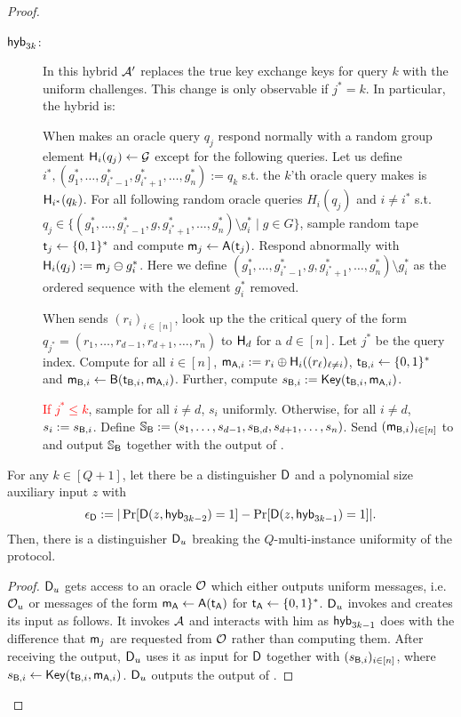 \begin{proof}
\begin{description}
 \item[$\mathsf{hyb}_{3k}$:]  In this hybrid $\mathcal{A}'$ replaces the true key exchange keys for query $k$ with the uniform challenges. This change is only observable if $j^*=k$. In  particular, the hybrid is:
 
 
 When \Adv makes an oracle query $q_{j}$ respond normally with a random group element $\mathsf{H}_i(q_{j})\leftarrow\mathcal{G}$ except for the following queries. Let us define $i^*, (g^*_1,\dots, g^*_{i^*-1},g^*_{i^*+1},\dots, g^*_{n}):=q_k$ s.t. the $k$'th oracle query \Adv makes is $\mathsf{H}_{i^*}(q_{k})$. 
For all following random oracle queries $H_i(q_j)$ and $i\neq i^*$ s.t. $q_j\in \{ (g^*_1,\dots, g^*_{i^*-1}, g,g^*_{i^*+1},\dots, g^*_{n}) \setminus g^*_i \mid g\in G \}$, sample random tape $\mathsf{t}_j\leftarrow\{0,1\}^*$ and compute $\mathsf{m}_{j}\leftarrow\mathsf{A}(\mathsf{t}_j)$. 
Respond abnormally with $\mathsf{H}_i(q_j):=\mathsf{m}_j\ominus g^*_{i}$. Here we define $(g^*_1,\dots, g^*_{i^*-1}, g,g^*_{i^*+1},\dots, g^*_{n}) \setminus g^*_i$ as the ordered sequence with the element $g^*_i$ removed. 
 
 When \Adv sends $(r_i)_{i\in[n]}$, look up the the critical query of the form $q_{j^*}= (r_1,\dots, r_{d-1},r_{d+1},\dots, r_{n})$ to $\mathsf{H}_d$ for a $d\in[n]$. Let $j^*$ be the query index. Compute for all $i\in[n]$, $\mathsf{m}_{\mathsf{A},i}:=r_i\oplus\mathsf{H}_i((r_\ell)_{\ell\neq i})$, $\mathsf{t}_{\mathsf{B},i}\leftarrow\{0,1\}^*$ and $\mathsf{m}_{\mathsf{B},i}\leftarrow\mathsf{B}(\mathsf{t}_{\mathsf{B},i},\mathsf{m}_{\mathsf{A},i})$. Further, compute $s_{\mathsf{B},i}:=\mathsf{Key}(\mathsf{t}_{\mathsf{B},i},\mathsf{m}_{\mathsf{A},i})$. 
 
 \textcolor{red}{If $j^*\leq k$}, sample for all $i\neq d$, $s_i$ uniformly. Otherwise, for all $i\neq d$, $s_i:=s_{\mathsf{B},i}$.   Define $\mathsf{\mathbb S}_{\mathsf{B}}:=(s_{1},\dots, s_{d-1},s_{\mathsf{B},d},s_{d+1},\dots, s_{n})$.  
 Send $(\mathsf{m}_{\mathsf{B},i})_{i\in[n]}$ to \Adv and output $\mathsf{\mathbb S}_{\mathsf{B}}$ together with the output of \Adv. 
 
\end{description}

\begin{claim}\label{claim:first}
For any $k\in[Q+1]$, let there be a distinguisher $\mathsf D$ and a polynomial size auxiliary input $z$ with
$$
\epsilon_{\mathsf D}:=|\Pr[\mathsf D(z,\mathsf{hyb}_{3k-2})=1] -\Pr[\mathsf D(z,\mathsf{hyb}_{3k-1})=1]|.
$$
Then, there is a distinguisher $\mathsf D_u$ breaking the $Q$-multi-instance uniformity of the \UKA protocol.
\end{claim}

\begin{proof}
 $\mathsf D_u$ gets access to an oracle $\mathcal{O}$ which either outputs uniform messages, i.e. $\mathcal{O}_u$ or messages of  the form $\mathsf{m}_\mathsf{A}\leftarrow\mathsf{A}(\mathsf{t}_\mathsf{A})$ for $\mathsf{t}_\mathsf{A}\leftarrow\{0,1\}^*$. $\mathsf D_u$ invokes \D and creates its input as follows. It invokes $\mathcal{A}$ and interacts with him as $\mathsf{hyb}_{3k-1}$ does with the difference that $\mathsf{m}_j$ are requested from $\mathcal{O}$ rather than computing them.  After receiving the output, $\mathsf D_u$ uses it as input for $\mathsf D$ together with $(s_{\mathsf{B},i})_{i\in[n]}$, where $s_{\mathsf{B},i}\leftarrow\mathsf{Key}(\mathsf{t}_{\mathsf{B},i},\mathsf{m}_{\mathsf{A},i})$. $\mathsf D_u$ outputs the output of \D. 


\end{proof}
\end{proof}
